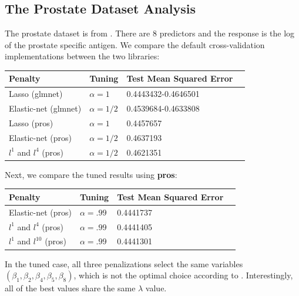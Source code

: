\documentclass[article]{jss}
\numberwithin{equation}{section}
\begin{document}
\subsection{The Prostate Dataset Analysis}

The prostate dataset is from \cite{prostate}.
There are 8 predictors and the response is the log of the prostate specific antigen.
We compare the default cross-validation implementations between the two libraries:

\begin{center}
\setlength{\tabcolsep}{20pt} %
\renewcommand{\arraystretch}{1} %
\begin{tabular}{lllp{7.4cm}}
\hline
Penalty & Tuning & Test Mean Squared Error \\ \hline
Lasso (glmnet) & $\alpha = 1$ & 0.4443432-0.4646501 \\
Elastic-net (glmnet) & $\alpha = 1/2$  & 0.4539684-0.4633808   \\
Lasso (pros) & $\alpha = 1$ &  0.4457657 \\
Elastic-net (pros) & $\alpha = 1/2$ &  0.4637193 \\
$l^1$ and $l^{4}$ (pros) & $\alpha = 1/2$ &  0.4621351 \\ \hline
\end{tabular}
\end{center}

Next, we compare the tuned results using \textbf{pros}:

\begin{center}
\setlength{\tabcolsep}{20pt} %
\renewcommand{\arraystretch}{1} %
\begin{tabular}{lllp{7.4cm}}
\hline
Penalty & Tuning & Test Mean Squared Error \\ \hline
Elastic-net (pros) & $\alpha = .99$ & 0.4441737 \\
$l^1$ and $l^{4}$ (pros) & $\alpha = .99$ &  0.4441405 \\
$l^1$ and $l^{10}$ (pros) & $\alpha = .99$ &  0.4441301 \\ \hline
\end{tabular}
\end{center}

In the tuned case, all three penalizations select the same variables $(\beta_1, \beta_2, \beta_4, \beta_5, \beta_8)$, which is not the optimal choice according to \cite{elasticnet}. Interestingly, all of the best values share the same $\lambda$ value.
\end{document}
